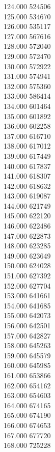 { 124.000	524506 \\
 125.000	534670 \\
 126.000	535117 \\
 127.000	567616 \\
 128.000	572040 \\
 129.000	572470 \\
 130.000	572922 \\
 131.000	574941 \\
 132.000	575360 \\
 133.000	586414 \\
 134.000	601464 \\
 135.000	601892 \\
 136.000	602258 \\
 137.000	616710 \\
 138.000	617012 \\
 139.000	617449 \\
 140.000	617837 \\
 141.000	618307 \\
 142.000	618632 \\
 143.000	619087 \\
 144.000	621749 \\
 145.000	622120 \\
 146.000	622486 \\
 147.000	622873 \\
 148.000	623285 \\
 149.000	623649 \\
 150.000	624028 \\
 151.000	627392 \\
 152.000	627704 \\
 153.000	641661 \\
 154.000	641685 \\
 155.000	642073 \\
 156.000	642501 \\
 157.000	642827 \\
 158.000	645263 \\
 159.000	645579 \\
 160.000	645985 \\
 161.000	653866 \\
 162.000	654162 \\
 163.000	654603 \\
 164.000	674165 \\
 165.000	674190 \\
 166.000	674653 \\
 167.000	677720 \\
 168.000	725228 \\
}
